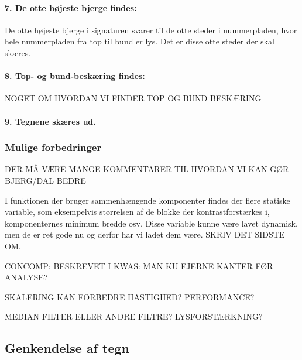 \paragraph{7. De otte højeste bjerge findes:}
De otte højeste bjerge i signaturen svarer til de otte steder i nummerpladen, hvor hele nummerpladen fra top til bund er lys. Det er disse otte steder der skal skæres.

\paragraph{8. Top- og bund-beskæring findes:}
NOGET OM HVORDAN VI FINDER TOP OG BUND BESKÆRING

\paragraph{9. Tegnene skæres ud.}





\subsubsection{Mulige forbedringer}
DER MÅ VÆRE MANGE KOMMENTARER TIL HVORDAN VI KAN GØR BJERG/DAL BEDRE

I funktionen der bruger sammenhængende komponenter findes der flere statiske variable, som eksempelvis størrelsen af de blokke der kontrastforstærkes i, komponenternes minimum bredde osv. Disse variable kunne være lavet dynamisk, men de er ret gode nu og derfor har vi ladet dem være. SKRIV DET SIDSTE OM.

CONCOMP: BESKREVET I KWAS: MAN KU FJERNE KANTER FØR ANALYSE?

SKALERING KAN FORBEDRE HASTIGHED? PERFORMANCE?

MEDIAN FILTER ELLER ANDRE FILTRE? LYSFORSTÆRKNING?



\subsection{Genkendelse af tegn}

